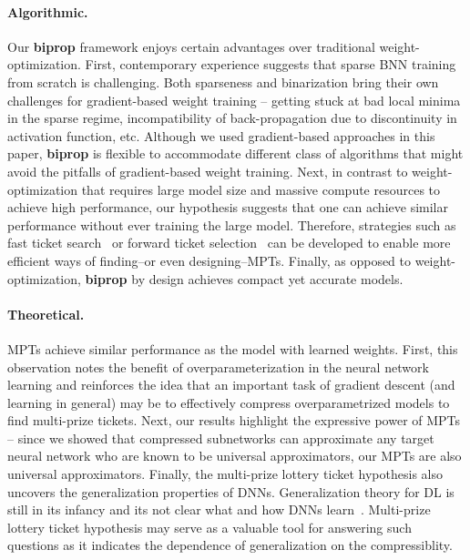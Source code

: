 \documentclass{article} \usepackage{iclr2021_conference,times}
\begin{document}
\paragraph{Algorithmic.}
Our \textbf{biprop} framework enjoys certain advantages over traditional weight-optimization. 
First, contemporary experience suggests that sparse BNN training from scratch is challenging. Both sparseness and binarization bring their own challenges for gradient-based weight training -- getting stuck at bad local minima in the sparse regime, incompatibility of back-propagation due to discontinuity in activation function, etc. Although we used gradient-based approaches in this paper, \textbf{biprop} is flexible to accommodate different class of algorithms that might avoid the pitfalls of gradient-based weight training.  
Next, in contrast to weight-optimization that requires large model size and massive compute resources to achieve high performance, our hypothesis suggests that one can achieve similar performance without ever training the large model. Therefore, strategies such as fast ticket search~\citep{you2019drawing} or forward ticket selection~\citep{ye2020good} can be developed to enable more efficient ways of finding--or even designing--MPTs.
Finally, as opposed to weight-optimization, \textbf{biprop} by design achieves compact yet accurate models.

\paragraph{Theoretical.}
MPTs achieve similar performance as the model with learned weights. 
First, this observation notes the benefit of overparameterization in the neural network learning and reinforces the idea that an important task of gradient descent (and learning in general) may be to effectively compress overparametrized models to find multi-prize tickets.  
Next, our results highlight the expressive power of MPTs -- since we showed that compressed subnetworks can approximate any target neural network who are known to be universal approximators, our MPTs are also universal approximators. 
Finally, the multi-prize lottery ticket hypothesis also uncovers the generalization properties of DNNs. Generalization theory for DL is still in its infancy and its not clear what and how DNNs learn~\citep{neyshabur2017exploring}. 
Multi-prize lottery ticket hypothesis may serve as a valuable tool for answering such questions as it indicates the dependence of generalization on the compressiblity.
\end{document}
